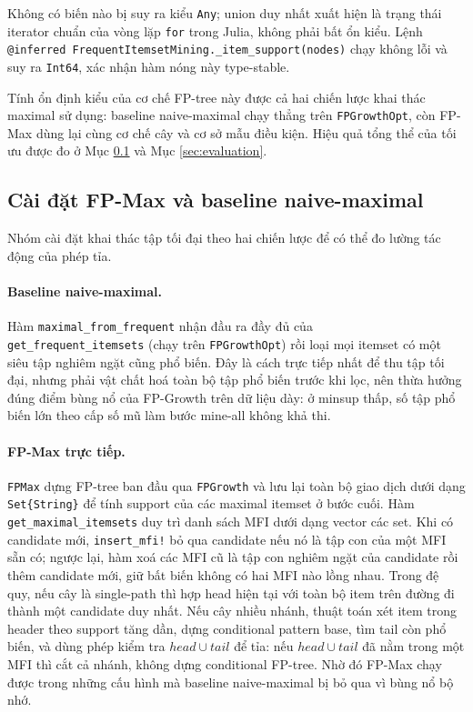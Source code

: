 Không có biến nào bị suy ra kiểu \texttt{Any}; union duy nhất xuất hiện là trạng thái iterator chuẩn của vòng lặp \texttt{for} trong Julia, không phải bất ổn kiểu. Lệnh \texttt{@inferred FrequentItemsetMining.\_item\_support(nodes)} chạy không lỗi và suy ra \texttt{Int64}, xác nhận hàm nóng này type-stable.

Tính ổn định kiểu của cơ chế FP-tree này được cả hai chiến lược khai thác maximal sử dụng: baseline naive-maximal chạy thẳng trên \texttt{FPGrowthOpt}, còn FP-Max dùng lại cùng cơ chế cây và cơ sở mẫu điều kiện. Hiệu quả tổng thể của tối ưu được đo ở Mục \ref{sec:implementation-fpmax} và Mục \ref{sec:evaluation}.

\subsection{Cài đặt FP-Max và baseline naive-maximal}
\label{sec:implementation-fpmax}

Nhóm cài đặt khai thác tập tối đại theo hai chiến lược để có thể đo lường tác động của phép tỉa.

\paragraph{Baseline naive-maximal.} Hàm \texttt{maximal\_from\_frequent} nhận đầu ra đầy đủ của \\\texttt{get\_frequent\_itemsets} (chạy trên \texttt{FPGrowthOpt}) rồi loại mọi itemset có một siêu tập nghiêm ngặt cũng phổ biến. Đây là cách trực tiếp nhất để thu tập tối đại, nhưng phải vật chất hoá toàn bộ tập phổ biến trước khi lọc, nên thừa hưởng đúng điểm bùng nổ của FP-Growth trên dữ liệu dày: ở minsup thấp, số tập phổ biến lớn theo cấp số mũ làm bước mine-all không khả thi.

\paragraph{FP-Max trực tiếp.} \texttt{FPMax} dựng FP-tree ban đầu qua \texttt{FPGrowth} và lưu lại toàn bộ giao dịch dưới dạng \texttt{Set\{String\}} để tính support của các maximal itemset ở bước cuối. Hàm \texttt{get\_maximal\_itemsets} duy trì danh sách MFI dưới dạng vector các set. Khi có candidate mới, \texttt{insert\_mfi!} bỏ qua candidate nếu nó là tập con của một MFI sẵn có; ngược lại, hàm xoá các MFI cũ là tập con nghiêm ngặt của candidate rồi thêm candidate mới, giữ bất biến không có hai MFI nào lồng nhau. Trong đệ quy, nếu cây là single-path thì hợp head hiện tại với toàn bộ item trên đường đi thành một candidate duy nhất. Nếu cây nhiều nhánh, thuật toán xét item trong header theo support tăng dần, dựng conditional pattern base, tìm tail còn phổ biến, và dùng phép kiểm tra $head \cup tail$ để tỉa: nếu $head\cup tail$ đã nằm trong một MFI thì cắt cả nhánh, không dựng conditional FP-tree. Nhờ đó FP-Max chạy được trong những cấu hình mà baseline naive-maximal bị bỏ qua vì bùng nổ bộ nhớ.

